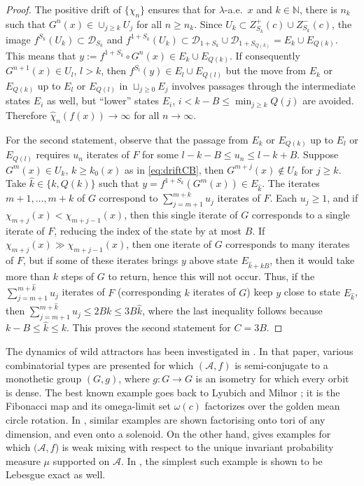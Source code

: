 \documentclass[12pt, psamsfonts, reqno]{amsart}
\begin{document}
\begin{proof}
The positive drift of $\{ \chi_n \}$ ensures that for
$\lambda$-a.e.\ $x$ and $k \in {{\mathbb N}}$, there is $n_k$ such that
$G^n(x) \in \cup_{j \geq k} U_j$ for all $n \geq n_k$. Since $U_k
\subset Z^+_{S_k}(c) \cup Z^-_{S_k}(c)$, the image $f^{S_k}(U_k)
\subset {{\mathcal D}}_{S_k}$ and $f^{1+S_k}(U_k) \subset {{\mathcal D}}_{1+S_k} \cup
{{\mathcal D}}_{1+S_{Q(k)}} = E_k \cup E_{Q(k)}$. This means that $y :=
f^{1+S_k} \circ G^n(x) \in  E_k \cup E_{Q(k)}$. If consequently
$G^{n+1}(x) \in U_l$, $l > k$, then $f^{S_l}(y) \in E_l \cup
E_{Q(l)}$ but the move from $E_k$ or $E_{Q(k)}$ up to $E_l$ or
$E_{Q(l)}$ in $\sqcup_{j \geq 0} E_j$ involves passages through
the intermediate states $E_i$ as well, but ``lower'' states $E_i$,
$i < k-B\leq \min_{j \geq k} Q(j)$ are avoided. Therefore
$\hat\chi_n(f(x)) \to \infty$ for all $n \to \infty$.

For the second statement, observe that the passage from $E_k$ or
$E_{Q(k)}$ up to $E_l$ or $E_{Q(l)}$ requires $u_n$ iterates of
$F$ for some $l-k-B \leq u_n \leq l-k+B$. Suppose $G^m(x) \in
U_k$, $k \geq k_0(x)$ as in \eqref{eq:driftCB}, then $G^{m+j}(x)
\notin U_k$ for $j \geq k$. Take $\hat k \in \{ k, Q(k) \}$ such
that $y = f^{1+S_k}(G^m(x)) \in E_{\hat k}$. The iterates $m+1,
\dots, m+k$ of $G$ correspond to $\sum_{j = m+1}^{m+k} u_j$
iterates of $F$. Each $u_j \geq 1$, and if $\chi_{m+j}(x) <
\chi_{m+j-1}(x)$, then this single iterate of $G$ corresponds to a
single iterate of $F$, reducing the index of the state by at most
$B$. If $\chi_{m+j}(x) \gg \chi_{m+j-1}(x)$, then one iterate of
$G$ corresponds to many iterates of $F$, but if some of these
iterates brings $y$ above state $E_{\hat k + kB}$, then it would
take more than $k$ steps of $G$ to return, hence this will not
occur. Thus, if the $\sum_{j = m+1}^{m+\hat k} u_j$ iterates of
$F$ (corresponding $k$ iterates of $G$) keep $y$ close to state
$E_{\hat k}$, then $\sum_{j = m+1}^{m+\hat k} u_j \leq 2Bk \leq
3B\hat k$, where the last inequality follows because $k-B \leq
\hat k \leq k$. This proves the second statement for $C = 3B$.
\end{proof}

The dynamics of wild attractors has been investigated in
\cite{BKS}. In that paper, various combinatorial types are
presented for which $({{\mathcal A}}, f)$ is semi-conjugate to a
monothetic group $(G,g)$, where $g:G \to G$ is an isometry for
which every orbit is dense. The best known example goes back to
Lyubich and Milnor \cite{LM}; it is the Fibonacci map and its
omega-limit set $\omega(c)$
factorizes over the golden mean circle rotation. In
\cite{BKS}, similar examples are shown factorising onto tori of
any dimension, and even onto a solenoid. On the other hand, \cite{BKS}
gives examples for which $({{\mathcal A}}, f$) is weak mixing with respect to the
unique invariant probability measure $\mu$ supported on
${{\mathcal A}}$. In \cite{BrHaw}, the simplest such example is shown
to be Lebesgue exact as well.
\end{document}
